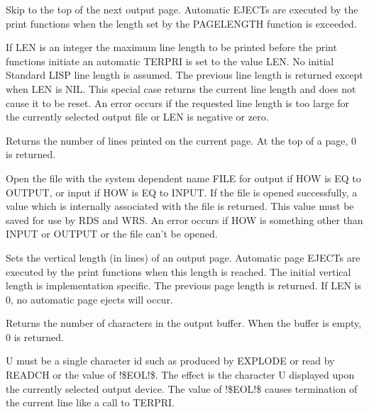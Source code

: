{Skip to the top of the next output page. Automatic EJECTs are
executed by the print functions when the length set by the PAGELENGTH
 function is exceeded.}


{If LEN is an integer the maximum line length to be printed before the
print functions initiate an automatic TERPRI is set to the value LEN.
No initial Standard LISP line length is assumed. The previous line
length is returned except when LEN is NIL. This special case returns
the current line length and does not cause it to be reset. An error
occurs if the requested line length is too large for the currently
selected output file or LEN is negative or zero.

}


{Returns the number of lines printed on the current page. At the top
of a page, 0 is returned. }


{Open the file with the system dependent name FILE for output if HOW
is EQ to OUTPUT, or input if HOW is EQ to INPUT. If the file is
   
opened successfully, a value which is internally associated with the
file is returned. This value must be saved for use by RDS and WRS. An
error occurs if HOW is something other than INPUT or OUTPUT or the
file can't be opened.

}


{Sets the vertical length (in lines) of an output page. Automatic page
EJECTs are executed by the print functions when this length is
reached. The initial vertical length is implementation specific. The
previous page length is returned. If LEN is 0, no automatic page
ejects will occur. }


{Returns the number of characters in the output buffer. When the
buffer is empty, 0 is returned.}


{U must be a single character id such as produced by EXPLODE or read
by READCH or the value of !\$EOL!\$. The effect is the character U
displayed upon the currently selected output device. The value of
!\$EOL!\$ causes termination of the current line like a call to
TERPRI.}


